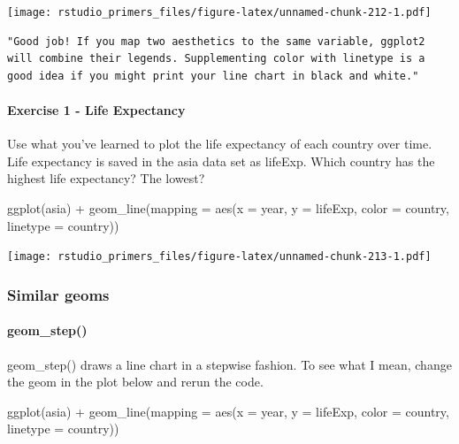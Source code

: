 \documentclass[
]{article}
\newenvironment{Shaded}{\begin{snugshade}}{\end{snugshade}}
\newcommand{\AttributeTok}[1]{\textcolor[rgb]{0.77,0.63,0.00}{#1}}
\newcommand{\FunctionTok}[1]{\textcolor[rgb]{0.00,0.00,0.00}{#1}}
\newcommand{\NormalTok}[1]{#1}
\newcommand{\SpecialCharTok}[1]{\textcolor[rgb]{0.00,0.00,0.00}{#1}}
\begin{document}
\texttt{[image: rstudio\_primers\_files/figure-latex/unnamed-chunk-212-1.pdf]}

\begin{verbatim}
"Good job! If you map two aesthetics to the same variable, ggplot2 will combine their legends. Supplementing color with linetype is a good idea if you might print your line chart in black and white."
\end{verbatim}

\hypertarget{exercise-1---life-expectancy}{%
\paragraph{Exercise 1 - Life
Expectancy}\label{exercise-1---life-expectancy}}

Use what you've learned to plot the life expectancy of each country over
time. Life expectancy is saved in the asia data set as lifeExp. Which
country has the highest life expectancy? The lowest?

\begin{Shaded}
\begin{Highlighting}[]
\FunctionTok{ggplot}\NormalTok{(asia) }\SpecialCharTok{+}
  \FunctionTok{geom\_line}\NormalTok{(}\AttributeTok{mapping =} \FunctionTok{aes}\NormalTok{(}\AttributeTok{x =}\NormalTok{ year, }\AttributeTok{y =}\NormalTok{ lifeExp, }\AttributeTok{color =}\NormalTok{ country, }\AttributeTok{linetype =}\NormalTok{ country))}
\end{Highlighting}
\end{Shaded}

\texttt{[image: rstudio\_primers\_files/figure-latex/unnamed-chunk-213-1.pdf]}

\hypertarget{similar-geoms-2}{%
\subsubsection{Similar geoms}\label{similar-geoms-2}}

\hypertarget{geom_step}{%
\paragraph{geom\_step()}\label{geom_step}}

geom\_step() draws a line chart in a stepwise fashion. To see what I
mean, change the geom in the plot below and rerun the code.

\begin{Shaded}
\begin{Highlighting}[]
\FunctionTok{ggplot}\NormalTok{(asia) }\SpecialCharTok{+}
  \FunctionTok{geom\_line}\NormalTok{(}\AttributeTok{mapping =} \FunctionTok{aes}\NormalTok{(}\AttributeTok{x =}\NormalTok{ year, }\AttributeTok{y =}\NormalTok{ lifeExp, }\AttributeTok{color =}\NormalTok{ country, }\AttributeTok{linetype =}\NormalTok{ country))}
\end{Highlighting}
\end{Shaded}
\end{document}

